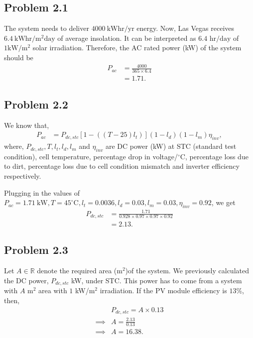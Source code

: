 \subsection*{Problem 2.1}
The system needs to deliver $4000\ \text{kWhr}/\text{yr}$ energy. Now, Las Vegas receives $6.4\ \text{kWhr}/\text{m}^2\text{day}$ of average insolation. It can be interpreted as $6.4 \text{ hr/day}$ of $1 \text{kW}/\text{m}^2$ solar irradiation. Therefore, the AC rated power (kW) of the system should be
\begin{align*}
	P_{ac} &= \frac{4000}{365\times 6.4}\\
	&= 1.71.
\end{align*}
\subsection*{Problem 2.2}
We know that,
\begin{align}
	P_{ac} &= P_{dc,stc}\left[1-((T-25)l_{t})\right](1-l_{d})(1-l_{m})\eta_{inv},
\end{align}
where, $P_{dc,stc}, T, l_{t}, l_{d}, l_{m}$ and $\eta_{inv}$ are DC power (kW) at STC (standard test condition), cell temperature, percentage drop in voltage/$^{\circ}$C, percentage loss due to dirt, percentage loss due to cell condition mismatch and inverter efficiency respectively.

Plugging in the values of $P_{ac}=1.71\ \text{kW}, T=45^{\circ}\text{C}, l_t = 0.0036, l_d=0.03, l_m=0.03, \eta_{inv}=0.92$, we get
\begin{align*}
	P_{dc,stc} &= \frac{1.71}{0.928\times 0.97 \times 0.97\times 0.92}\\
	&= 2.13.
\end{align*}
\subsection*{Problem 2.3}
Let $A\in \mathbb{R}$ denote the required area (m$^2$)of the system. We previously calculated the DC power, $P_{dc,stc}$ kW, under STC. This power has to come from a system with $A$ m$^2$ area with $1$ kW/m$^2$ irradiation. If the PV module efficiency is $13$\%, then,
\begin{align*}
	&P_{dc,stc} = A\times 0.13\\
	\implies & A = \frac{2.13}{0.13}\\
	\implies & A = 16.38.
\end{align*}
